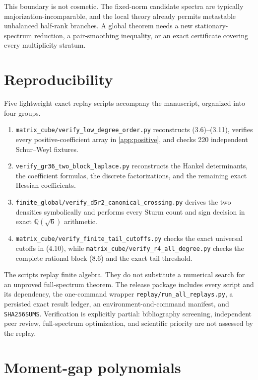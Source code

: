 \documentclass[11pt]{article}
\begin{document}
This boundary is not cosmetic.  The fixed-norm candidate spectra are
typically majorization-incomparable, and the local theory already permits
metastable unbalanced half-rank branches.  A global theorem needs a new
stationary-spectrum reduction, a pair-smoothing inequality, or an exact
certificate covering every multiplicity stratum.

\section{Reproducibility}

Five lightweight exact replay scripts accompany the manuscript, organized
into four groups.
\begin{enumerate}[label=(\roman*)]
\item \texttt{matrix\_cube/verify\_low\_degree\_order.py} reconstructs
      (3.6)--(3.11), verifies every positive-coefficient array in
      \cref{app:positive}, and checks 220 independent Schur--Weyl fixtures.
\item \texttt{verify\_gr36\_two\_block\_laplace.py} reconstructs the Hankel
      determinants, the coefficient formulas, the discrete factorizations,
      and the remaining exact Hessian coefficients.
\item \texttt{finite\_global/verify\_d5r2\_canonical\_crossing.py} derives
      the two densities symbolically and performs every Sturm count and sign
      decision in exact $\mathbb Q(\sqrt6)$ arithmetic.
\item \texttt{matrix\_cube/verify\_finite\_tail\_cutoffs.py} checks the
      exact universal cutoffs in (4.10), while
      \texttt{matrix\_cube/verify\_r4\_all\_degree.py} checks the complete
      rational block (8.6) and the exact tail threshold.
\end{enumerate}
The scripts replay finite algebra.  They do not substitute a numerical
search for an unproved full-spectrum theorem.
The release package includes every script and its dependency, the one-command
wrapper \texttt{replay/run\_all\_replays.py}, a persisted exact result ledger,
an environment-and-command manifest, and \texttt{SHA256SUMS}.  Verification
is explicitly partial: bibliography screening, independent peer review,
full-spectrum optimization, and scientific priority are not assessed by the
replay.

\appendix
\section{Moment-gap polynomials}\label{app:polynomials}
\end{document}
